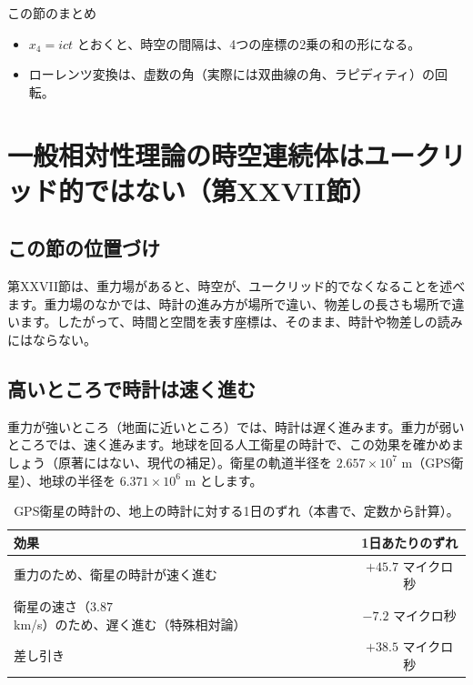 \documentclass[a4paper,11pt,openany]{ltjsbook}
\begin{document}
\begin{pointbox}{この節のまとめ}
\begin{itemize}[leftmargin=*]
\item $x_4=ict$ とおくと、時空の間隔は、4つの座標の2乗の和の形になる。
\item ローレンツ変換は、虚数の角（実際には双曲線の角、ラピディティ）の回転。
\end{itemize}
\end{pointbox}

\chapter{一般相対性理論の時空連続体はユークリッド的ではない（第XXVII節）}

\section{この節の位置づけ}

第XXVII節は、重力場があると、時空が、ユークリッド的でなくなることを述べます。重力場のなかでは、時計の進み方が場所で違い、物差しの長さも場所で違います。したがって、時間と空間を表す座標は、そのまま、時計や物差しの読みにはならない。

\section{高いところで時計は速く進む}

重力が強いところ（地面に近いところ）では、時計は遅く進みます。重力が弱いところでは、速く進みます。地球を回る人工衛星の時計で、この効果を確かめましょう（原著にはない、現代の補足）。衛星の軌道半径を $2.657\times10^{7}$ m（GPS衛星）、地球の半径を $6.371\times10^6$ m とします。

\begin{table}[htbp]
\centering
\begin{tabular}{lc}
\toprule
効果 & 1日あたりのずれ\\
\midrule
重力のため、衛星の時計が速く進む & $+45.7$ マイクロ秒\\
衛星の速さ（$3.87$ km/s）のため、遅く進む（特殊相対論） & $-7.2$ マイクロ秒\\
差し引き & $+38.5$ マイクロ秒\\
\bottomrule
\end{tabular}
\caption{GPS衛星の時計の、地上の時計に対する1日のずれ（本書で、定数から計算）。}
\end{table}
\end{document}

